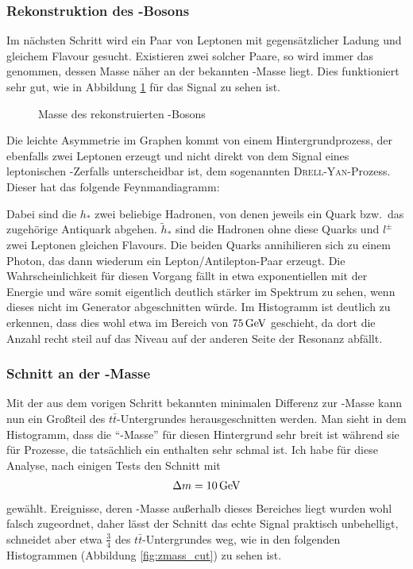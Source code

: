 \subsubsection{Rekonstruktion des \Z-Bosons}
Im nächsten Schritt wird ein Paar von Leptonen mit gegensätzlicher Ladung und
gleichem Flavour gesucht. Existieren zwei solcher Paare, so wird immer das
genommen, dessen Masse näher an der bekannten \Z-Masse liegt. Dies funktioniert
sehr gut, wie in Abbildung \ref{fig:signal_zmasse} für das Signal zu sehen ist.
\begin{figure}
  \begin{center}
    
  \end{center}
  \caption{Masse des rekonstruierten \Z-Bosons}
  \label{fig:signal_zmasse}
\end{figure}

Die leichte Asymmetrie im Graphen kommt von einem Hintergrundprozess, der
ebenfalls zwei Leptonen erzeugt und nicht direkt von dem Signal eines
leptonischen \Z-Zerfalls unterscheidbar ist, dem sogenannten
\textsc{Drell}-\textsc{Yan}-Prozess. Dieser hat das folgende Feynmandiagramm:
\begin{center}
  
\end{center}

Dabei sind die $h_*$ zwei beliebige Hadronen, von denen jeweils ein Quark bzw.\
das zugehörige Antiquark abgehen. $\tilde{h}_*$ sind die Hadronen ohne diese
Quarks und $l^\pm$ zwei Leptonen gleichen Flavours. Die beiden Quarks
annihilieren sich zu einem Photon, das dann wiederum ein Lepton/Antilepton-Paar
erzeugt. Die Wahrscheinlichkeit für diesen Vorgang fällt in etwa exponentiellen
mit der Energie und wäre somit eigentlich deutlich stärker im Spektrum zu sehen,
wenn dieses nicht im Generator abgeschnitten würde. Im Histogramm ist deutlich
zu erkennen, dass dies wohl etwa im Bereich von $\unit[75]{GeV}$ geschieht, da
dort die Anzahl recht steil auf das Niveau auf der anderen Seite der Resonanz
abfällt.

\subsubsection{Schnitt an der \Z-Masse}
Mit der aus dem vorigen Schritt bekannten minimalen Differenz zur \Z-Masse kann
nun ein Großteil des $t\bar{t}$-Untergrundes herausgeschnitten werden. Man sieht
in dem Histogramm, dass die "`\Z-Masse"' für diesen Hintergrund sehr breit ist
während sie für Prozesse, die tatsächlich ein \Z enthalten sehr schmal ist. Ich
habe für diese Analyse, nach einigen Tests den Schnitt mit
\begin{align}
  \Delta m = \unit[10]{GeV}
\end{align}
gewählt. Ereignisse, deren
\Z-Masse außerhalb dieses Bereiches liegt wurden wohl falsch zugeordnet, daher
lässt der Schnitt das echte Signal praktisch unbehelligt, schneidet aber etwa
$\frac{3}{4}$ des $t\bar{t}$-Untergrundes weg, wie in den folgenden Histogrammen
(Abbildung \ref{fig:zmass_cut}) zu sehen ist.

